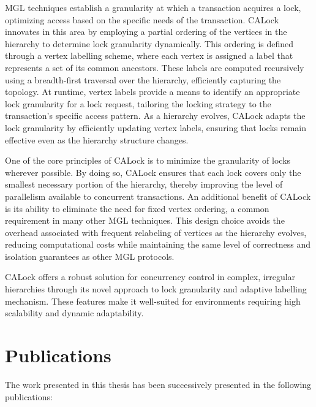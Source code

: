 MGL techniques establish a granularity at which a transaction acquires a lock, optimizing access based on the specific needs of the transaction. CALock innovates in this area by employing a partial ordering of the vertices in the hierarchy to determine lock granularity dynamically. This ordering is defined through a vertex labelling scheme, where each vertex is assigned a label that represents a set of its common ancestors. These labels are computed recursively using a breadth-first traversal over the hierarchy, efficiently capturing the topology. At runtime, vertex labels provide a means to identify an appropriate lock granularity for a lock request, tailoring the locking strategy to the transaction's specific access pattern. As a hierarchy evolves, CALock adapts the lock granularity by efficiently updating vertex labels, ensuring that locks remain effective even as the hierarchy structure changes.

One of the core principles of CALock is to minimize the granularity of locks wherever possible. By doing so, CALock ensures that each lock covers only the smallest necessary portion of the hierarchy, thereby improving the level of parallelism available to concurrent transactions. An additional benefit of CALock is its ability to eliminate the need for fixed vertex ordering, a common requirement in many other MGL techniques. This design choice avoids the overhead associated with frequent relabeling of vertices as the hierarchy evolves, reducing computational costs while maintaining the same level of correctness and isolation guarantees as other MGL protocols.

CALock offers a robust solution for concurrency control in complex, irregular hierarchies through its novel approach to lock granularity and adaptive labelling mechanism. These features make it well-suited for environments requiring high scalability and dynamic adaptability.

\newpage
\section*{Publications}

The work presented in this thesis has been successively presented in the following publications:



